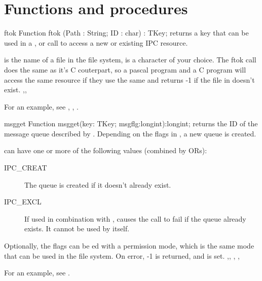 \section{Functions and procedures}

\begin{function}{ftok}
\Declaration
Function ftok (Path : String; ID : char) : TKey;
\Description
{} returns a key that can be used in a ,
or  call to access a new or existing IPC resource.

 is the name of a file in the file system,  is a
character of your choice. The ftok call does the same as it's C couterpart,
so a pascal program and a C program will access the same resource if
they use the same  and 
\Errors
{} returns -1 if the file in  doesn't exist.
\SeeAlso
{},,
\end{function}

For an example, see , , .

\begin{function}{msgget}
\Declaration
Function msgget(key: TKey; msgflg:longint):longint;	
\Description
{} returns the ID of the message queue described by .
Depending on the flags in , a new queue is created.

 can have one or more of the following values (combined by ORs):
\begin{description}
\item[IPC\_CREAT] The queue is created if it doesn't already exist.
\item[IPC\_EXCL] If used in combination with , causes the
call to fail if the queue already exists. It cannot be used by itself.
\end{description}
Optionally, the flags can be ed with a permission mode, which is the
same mode that can be used in the file system.
\Errors
On error, -1 is returned, and  is set.
\SeeAlso
{},, , , 
\end{function}

For an example, see .

